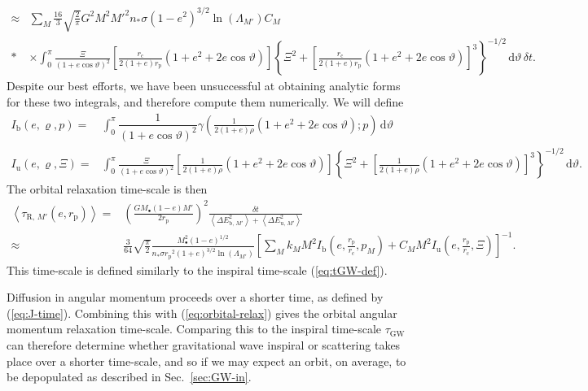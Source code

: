 \documentclass[useAMS,usedcolumn,usegraphicx,usenatbib]{mn2e}
\newcommand{\eqnref}[1]{(\ref{eq:#1})}
\newcommand{\secref}[1]{Sec.~\ref{sec:#1}}
\newcommand{\sub}[1]{\ensuremath{_\mathrm{#1}}}
\newcommand{\dd}{\ensuremath{\mathrm{d}}}
\newcommand{\intd}[4]{\ensuremath{\displaystyle \int_{#1}^{#2}{#3}\,\dd{#4}}}
\newcommand{\recip}[1]{\ensuremath{\dfrac{1}{#1}}}
\begin{document}
\begin{onecolumn}
\begin{align}
 \approx {} & \sum_M \frac{16}{3}\sqrt{\frac{2}{\pi}}G^2 M^2{M'}^2n_\ast\sigma\left(1-e^2\right)^{3/2}\ln\left(\Lambda_{M'}\right)C_M \nonumber \\*
 & \times {} \intd{0}{\pi}{\frac{\Xi}{(1 + e \cos\vartheta)^2}\left[\frac{r\sub{c}}{2(1+e)r\sub{p}}\left(1+e^2+2e\cos\vartheta\right)\right]\left\{\Xi^2 + \left[\frac{r\sub{c}}{2(1+e)r\sub{p}}\left(1+e^2+2e\cos\vartheta\right)\right]^3\right\}^{-1/2}}{\vartheta}\,\delta t.
\end{align}
Despite our best efforts, we have been unsuccessful at obtaining analytic forms for these two integrals, and therefore compute them numerically. We will define
\begin{align}
I\sub{b}(e,\varrho,p) = {} & \intd{0}{\pi}{\recip{(1 + e \cos\vartheta)^2}\gamma\left(\frac{1}{2(1+e)\rho}\left(1+e^2+2e\cos\vartheta\right);p\right)}{\vartheta} \\
I\sub{u}(e,\varrho,\Xi) = {} & \intd{0}{\pi}{\frac{\Xi}{(1 + e \cos\vartheta)^2}\left[\frac{1}{2(1+e)\rho}\left(1+e^2+2e\cos\vartheta\right)\right]\left\{\Xi^2 + \left[\frac{1}{2(1+e)\rho}\left(1+e^2+2e\cos\vartheta\right)\right]^3\right\}^{-1/2}}{\vartheta}.
\end{align}
The orbital relaxation time-scale is then
\begin{align}
\left\langle\tau_{\mathrm{R},\,M'}\left(e,r\sub{p}\right)\right\rangle = {} & \left(\frac{GM_\bullet(1 - e)M'}{2r\sub{p}}\right)^2\frac{\delta t}{\left\langle\Delta E^2_{\mathrm{b},\,M'}\right\rangle + \left\langle\Delta E^2_{\mathrm{u},\,M'}\right\rangle} \\
 \approx {} & \frac{3}{64}\sqrt{\frac{\pi}{2}} \frac{M_\bullet^2(1 - e)^{1/2}}{n_\ast \sigma r\sub{p}^2(1 + e)^{3/2}\ln\left(\Lambda_{M'}\right)} \left[\sum_M k_M M^2 I\sub{b}\left(e,\frac{r\sub{p}}{r\sub{c}},p_M\right) + C_M M^2 I\sub{u}\left(e,\frac{r\sub{p}}{r\sub{c}},\Xi\right)\right]^{-1}.
\label{eq:orbital-relax}
\end{align}
This time-scale is defined similarly to the inspiral time-scale \eqnref{tGW-def}.

Diffusion in angular momentum proceeds over a shorter time, as defined by \eqnref{J-time}. Combining this with \eqnref{orbital-relax} gives the orbital angular momentum relaxation time-scale. Comparing this to the inspiral time-scale $\tau\sub{GW}$ can therefore determine whether gravitational wave inspiral or scattering takes place over a shorter time-scale, and so if we may expect an orbit, on average, to be depopulated as described in \secref{GW-in}.


\end{onecolumn}
\end{document}
